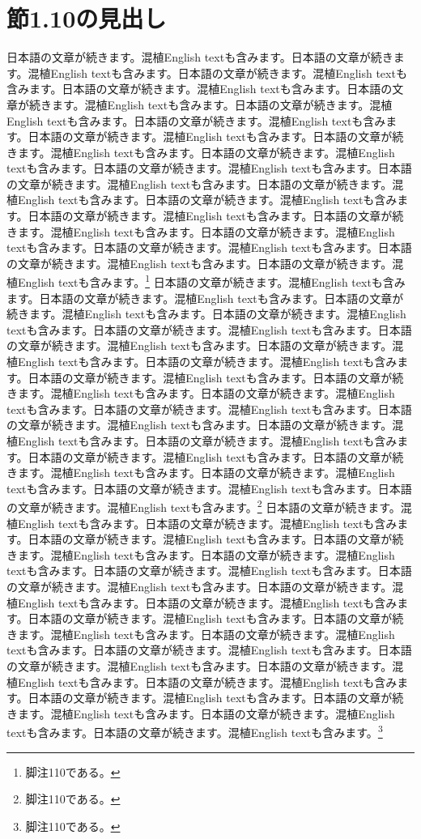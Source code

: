 \documentclass[pdflatex,book]{jlreq}
\begin{document}
\section{節1.10の見出し}
日本語の文章が続きます。混植English textも含みます。日本語の文章が続きます。混植English textも含みます。日本語の文章が続きます。混植English textも含みます。日本語の文章が続きます。混植English textも含みます。日本語の文章が続きます。混植English textも含みます。日本語の文章が続きます。混植English textも含みます。日本語の文章が続きます。混植English textも含みます。日本語の文章が続きます。混植English textも含みます。日本語の文章が続きます。混植English textも含みます。日本語の文章が続きます。混植English textも含みます。日本語の文章が続きます。混植English textも含みます。日本語の文章が続きます。混植English textも含みます。日本語の文章が続きます。混植English textも含みます。日本語の文章が続きます。混植English textも含みます。日本語の文章が続きます。混植English textも含みます。日本語の文章が続きます。混植English textも含みます。日本語の文章が続きます。混植English textも含みます。日本語の文章が続きます。混植English textも含みます。日本語の文章が続きます。混植English textも含みます。日本語の文章が続きます。混植English textも含みます。\footnote{脚注110である。}
日本語の文章が続きます。混植English textも含みます。日本語の文章が続きます。混植English textも含みます。日本語の文章が続きます。混植English textも含みます。日本語の文章が続きます。混植English textも含みます。日本語の文章が続きます。混植English textも含みます。日本語の文章が続きます。混植English textも含みます。日本語の文章が続きます。混植English textも含みます。日本語の文章が続きます。混植English textも含みます。日本語の文章が続きます。混植English textも含みます。日本語の文章が続きます。混植English textも含みます。日本語の文章が続きます。混植English textも含みます。日本語の文章が続きます。混植English textも含みます。日本語の文章が続きます。混植English textも含みます。日本語の文章が続きます。混植English textも含みます。日本語の文章が続きます。混植English textも含みます。日本語の文章が続きます。混植English textも含みます。日本語の文章が続きます。混植English textも含みます。日本語の文章が続きます。混植English textも含みます。日本語の文章が続きます。混植English textも含みます。日本語の文章が続きます。混植English textも含みます。\footnote{脚注110である。}
日本語の文章が続きます。混植English textも含みます。日本語の文章が続きます。混植English textも含みます。日本語の文章が続きます。混植English textも含みます。日本語の文章が続きます。混植English textも含みます。日本語の文章が続きます。混植English textも含みます。日本語の文章が続きます。混植English textも含みます。日本語の文章が続きます。混植English textも含みます。日本語の文章が続きます。混植English textも含みます。日本語の文章が続きます。混植English textも含みます。日本語の文章が続きます。混植English textも含みます。日本語の文章が続きます。混植English textも含みます。日本語の文章が続きます。混植English textも含みます。日本語の文章が続きます。混植English textも含みます。日本語の文章が続きます。混植English textも含みます。日本語の文章が続きます。混植English textも含みます。日本語の文章が続きます。混植English textも含みます。日本語の文章が続きます。混植English textも含みます。日本語の文章が続きます。混植English textも含みます。日本語の文章が続きます。混植English textも含みます。日本語の文章が続きます。混植English textも含みます。\footnote{脚注110である。}
\end{document}
